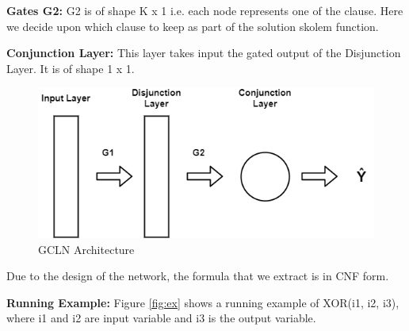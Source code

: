 \smallskip
\noindent\textbf{Gates G2:} G2 is of shape K x 1 i.e. each node represents one of the clause. 
Here we decide upon which clause to keep as part of the solution skolem function.

\smallskip
\noindent\textbf{Conjunction Layer:} This layer takes input the gated output of the Disjunction Layer. It is of shape 1 x 1. 

\begin{figure}
	\centering
    \includegraphics[scale=0.4]{gcln.png}
    \caption{GCLN Architecture}
    \label{fig:gcln}
\end{figure}

Due to the design of the network, the formula that we extract is in CNF form.
\newline

\noindent\textbf{Running Example:} Figure \ref{fig:ex} shows a running example of XOR(i1, i2, i3), 
where i1 and i2 are input variable and i3 is the output variable.

